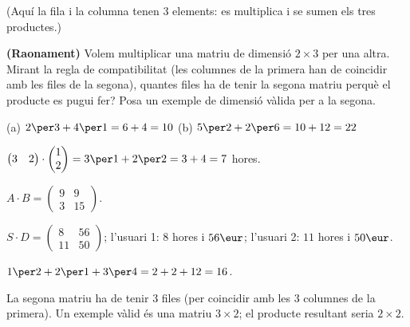 \begin{exercicis}
\begin{exlist}
        (Aquí la fila i la columna tenen $3$ elements: es multiplica i se sumen
        els tres productes.)
  \item \textbf{(Raonament)} Volem multiplicar una matriu de dimensió $2\times 3$
        per una altra. Mirant la regla de compatibilitat (les columnes de la
        primera han de coincidir amb les files de la segona), quantes files ha de
        tenir la segona matriu perquè el producte es pugui fer? Posa un exemple de
        dimensió vàlida per a la segona.
\end{exlist}
\end{exercicis}

\begin{solucions}
\begin{sollist}
  \item (a) $2\per 3+4\per 1=6+4=10$ \quad (b) $5\per 2+2\per 6=10+12=22$
  \item $\begin{pmatrix} 3 & 2 \end{pmatrix}\cdot\begin{pmatrix} 1 \\ 2 \end{pmatrix}
        =3\per 1+2\per 2=3+4=7$ hores.
  \item $A\cdot B=\begin{pmatrix} 9 & 9 \\ 3 & 15 \end{pmatrix}$.
  \item $S\cdot D=\begin{pmatrix} 8 & 56 \\ 11 & 50 \end{pmatrix}$;
        \;l'usuari 1: $8$ hores i $56\eur$; l'usuari 2: $11$ hores i $50\eur$.
  \item $1\per 2+2\per 1+3\per 4=2+2+12=16$.
  \item La segona matriu ha de tenir $3$ files (per coincidir amb les $3$ columnes
        de la primera). Un exemple vàlid és una matriu $3\times 2$; el producte
        resultant seria $2\times 2$.
\end{sollist}
\end{solucions}
